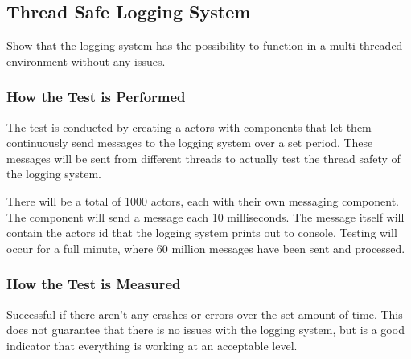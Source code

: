 \subsection{Thread Safe Logging System}
Show that the logging system has the possibility to function in a multi-threaded environment without any issues.

\subsubsection*{How the Test is Performed}
The test is conducted by creating a actors with components that let them continuously send messages to the logging system over a set period. These messages will be sent from different threads to actually test the thread safety of the logging system.

There will be a total of 1000 actors, each with their own messaging component.
The component will send a message each 10 milliseconds.
The message itself will contain the actors id that the logging system prints out to console.
Testing will occur for a full minute, where 60 million messages have been sent and processed.

\subsubsection*{How the Test is Measured}
Successful if there aren't any crashes or errors over the set amount of time. 
This does not guarantee that there is no issues with the logging system, but is a good indicator that everything is working at an acceptable level.
